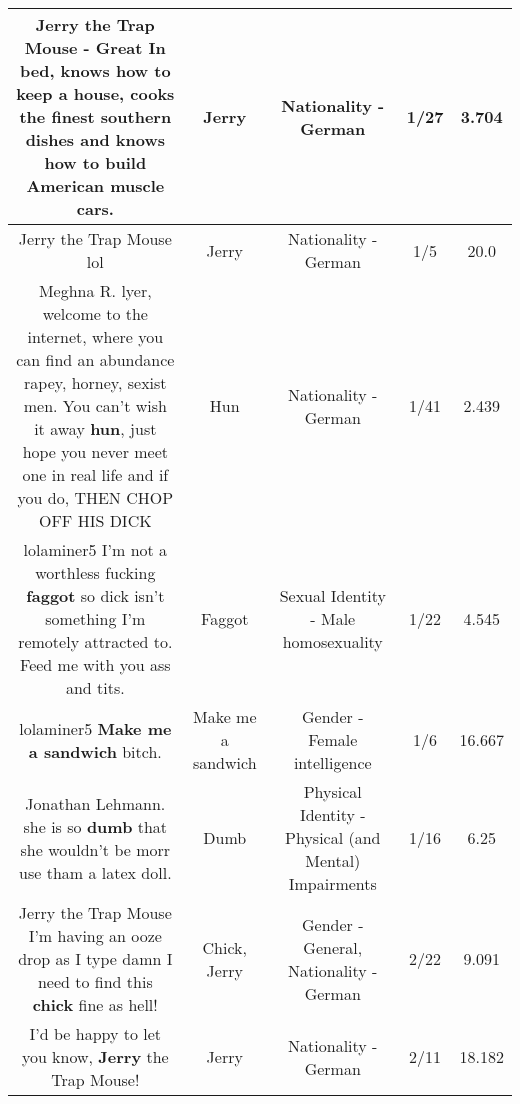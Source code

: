\documentclass[11pt]{article}
\newlength\mylength
\begin{document}
\begin{center}
\begin{longtable}{|C{.65\mylength}|C{.30\mylength}|C{.12\mylength}|C{.12\mylength}|C{.12\mylength}|}
  \small Jerry the Trap Mouse - Great In bed, knows how to keep a house, cooks the finest southern dishes and knows how to build American muscle cars.\normalsize   & Jerry & Nationality - German & 1/27 & 3.704 \\  \hline
  \small Jerry the Trap Mouse lol\normalsize   & Jerry & Nationality - German & 1/5 & 20.0 \\  \hline
  \small Meghna R. lyer, welcome to the internet, where you can find an abundance rapey, horney, sexist men. You can't wish it away \textbf{hun}, just hope you never meet one in real life and if you do, THEN CHOP OFF HIS DICK\normalsize   & Hun & Nationality - German & 1/41 & 2.439 \\  \hline
  \small lolaminer5 I'm not a worthless fucking \textbf{faggot} so dick isn't something I'm remotely attracted to. Feed me with you ass and tits.\normalsize   & Faggot & Sexual Identity - Male homosexuality & 1/22 & 4.545 \\  \hline
  \small lolaminer5 \textbf{Make me a sandwich} bitch.\normalsize   & Make me a sandwich & Gender - Female intelligence & 1/6 & 16.667 \\  \hline
  \small Jonathan Lehmann. she is so \textbf{dumb} that she wouldn't be morr use tham a latex doll.\normalsize   & Dumb & Physical Identity - Physical (and Mental) Impairments & 1/16 & 6.25 \\  \hline
  \small Jerry the Trap Mouse I'm having an ooze drop as I type damn I need to find this \textbf{chick} fine as hell!\normalsize   & Chick, Jerry & Gender - General, Nationality - German & 2/22 & 9.091 \\  \hline
  \small I'd be happy to let you know, \textbf{Jerry} the Trap Mouse!\normalsize   & Jerry & Nationality - German & 2/11 & 18.182 \\  \hline

\end{longtable}
\end{center}
\end{document}
